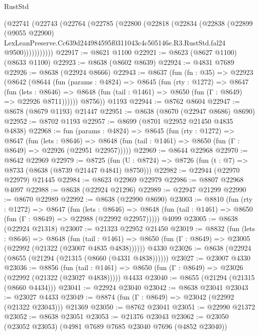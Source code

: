 \begin{lexlean}{RustStd}
\begin{coremodule}
        (@22741
          (@22743
            (@22764
              (@22785
                (@22800
                  (@22818
                    (@22834
                      (@22838
                        (@22899
                          (@9055 @22900)
                          LexLeanPreserve.Cc639d244984595f0311043c4c505146e.R3.RustStd.fal24
                          @9500)))))))))))
@22917 := @8621 @1100
@22921 := @8623 (@8627 @1100) (@8633 @1100)
@22923 := @8638 (@8602 @8639)
@22924 := @4831 @7689
@22926 := @8638 (@22924 @8666)
@22943 := @8637
    (fun (fn : @35) =>
    @22923
      (@8642
        (@8644
          (fun (params : @4824) =>
          @8645
            (fun (rty : @1272) =>
            @8647
              (fun (lets : @8646) =>
              @8648 (fun (tail : @1461) => @8650 (fun (Γ : @8649) => @22926 @8711))))))
        @8756))
    @1193
@22944 := @8762 @8604
@22947 := @8678 (@8679 @1193) @21447
@22951 := @8638 (@8670 (@22947 @8686) @8690)
@22952 := @8702 @1193
@22957 := @8699 (@8701 @22952 @21450 @4835 @4838)
@22968 := fun (params : @4824) =>
  @8645
    (fun (rty : @1272) =>
    @8647
      (fun (lets : @8646) =>
      @8648 (fun (tail : @1461) => @8650 (fun (Γ : @8649) => @22926 (@22951 @22957)))))
@22969 := @8644 @22968
@22970 := @8642 @22969
@22979 := @8725
    (fun (U : @8724) => @8726 (fun (t : @7) => @8733 (@8638 (@8739 @21447 @4841) @8750)))
@22982 := @22944 (@22970 @22979) @21445
@22984 := @8623 @22969 @22979
@22986 := @8807 @22968 @4097
@22988 := @8638 (@22924 @21296)
@22989 := @22947 @21299
@22990 := @8670 @22989
@22992 := @8638 (@22990 @8690)
@23003 := @8810
    (fun (rty : @1272) =>
    @8647
      (fun (lets : @8646) =>
      @8648 (fun (tail : @1461) => @8650 (fun (Γ : @8649) => @22988 (@22992 @22957)))))
    @4099
@23005 := @8638 (@22924 @21318)
@23007 := @21323 @22952 @21450
@23019 := @8832
    (fun (lets : @8646) =>
    @8648
      (fun (tail : @1461) =>
      @8650 (fun (Γ : @8649) => @23005 (@22992 (@21322 (@23007 @4835 @4838))))))
    @4330
@23026 := @8638 (@22924 (@8655 (@21294 (@21315 (@8660 (@4331 @4838))))))
@23027 := @23007 @4330
@23036 := @8856
    (fun (tail : @1461) => @8650 (fun (Γ : @8649) => @23026 (@22992 (@21322 (@23027 @4838)))))
    @4433
@23040 := @8655 (@21294 (@21315 (@8660 @4434)))
@23041 := @22924 @23040
@23042 := @8638 @23041
@23043 := @23027 @4433
@23049 := @8874 (fun (Γ : @8649) => @23042 (@22992 (@21322 @23043))) @21369
@23050 := @8762 @23041
@23051 := @22990 @21372
@23052 := @8638 @23051
@23053 := @21376 @23043
@23062 := @23050 (@23052 @23053) (@4981 @7689 @7685 @23040 @7696 (@4852 @23040))

\end{coremodule}
\end{lexlean}
